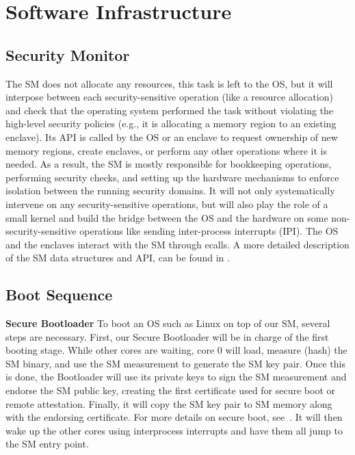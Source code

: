\section{Software Infrastructure}
\label{app:softwareinfrastructure}

\subsection{Security Monitor}
The SM does not allocate any resources, this task is left to the OS, but it will interpose between each security-sensitive operation (like a resource allocation) and check that the operating system performed the task without violating the high-level security policies (e.g., it is allocating a memory region to an existing enclave).
Its API is called by the OS or an enclave to request ownership of new memory regions, create enclaves, or perform any other operations where it is needed.
As a result, the SM is mostly responsible for bookkeeping operations, performing security checks, and setting up the hardware mechanisms to enforce isolation between the running security domains.
It will not only systematically intervene on any security-sensitive operations, but will also play the role of a small kernel and build the bridge between the OS and the hardware on some non-security-sensitive operations like sending inter-process interrupts (IPI).
The OS and the enclaves interact with the SM through ecalls.
A more detailed description of the SM data structures and API, can be found in \cite{lebedev2019sanctorum}.

\subsection{Boot Sequence}
\noindent\textbf{Secure Bootloader}
To boot an OS such as Linux on top of our SM, several steps are necessary.
First, our Secure Bootloader will be in charge of the first booting stage.
While other cores are waiting,
core 0 will load, measure (hash) the SM binary, and use the SM measurement to generate the SM key pair. 
Once this is done, the Bootloader will use its private keys to sign the SM measurement and endorse the SM public key, creating the first certificate used for secure boot or remote attestation.
Finally, it will copy the SM key pair to SM memory along with the endorsing certificate.
For more details on secure boot, see~\cite{lebedev2018secure}.
It will then wake up the other cores using interprocess interrupts and have them all jump to the SM entry point.
\\

